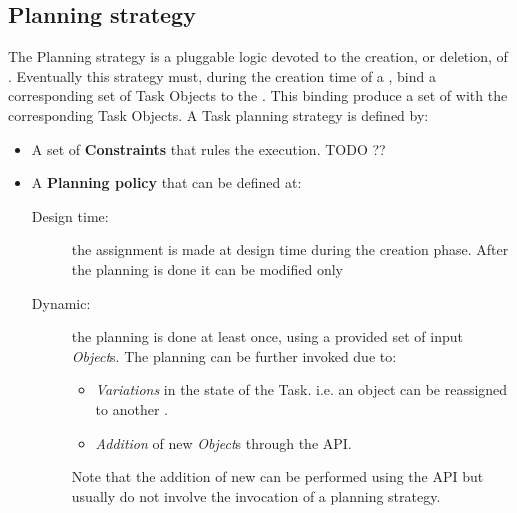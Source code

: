\subsection{\utask{} Planning strategy}
The \utask{} Planning strategy is a pluggable logic devoted to the creation, or
deletion, of \utask{}. Eventually this strategy must, during the creation
time of a \utask{}, bind a corresponding set of Task Objects to the \utask{}.
This binding produce a set of \utask{} with the corresponding Task Objects. A
Task planning strategy is defined by:
\begin{itemize}
    \item A set of \textbf{Constraints} that rules the execution. TODO ??

    \item A \textbf{Planning policy} that can be defined at:
        \begin{description}
            \item[Design time:] the assignment is made at design time during the
            creation phase. After the planning is done it can be modified only

            \item[Dynamic:] the planning is done at least once, using a provided
            set of input \emph{Object}s. The planning can be further invoked due
            to:
            \begin{itemize}
                \item \emph{Variations} in the state of the Task. i.e. an object
                can be reassigned to another \utask{}.

                \item \emph{Addition} of new \emph{Object}s through the API.
            \end{itemize}
            Note that the addition of new \utask{} can be performed using the
            API but usually do not involve the invocation of a \utask{} planning
            strategy.
        \end{description}
\end{itemize}



